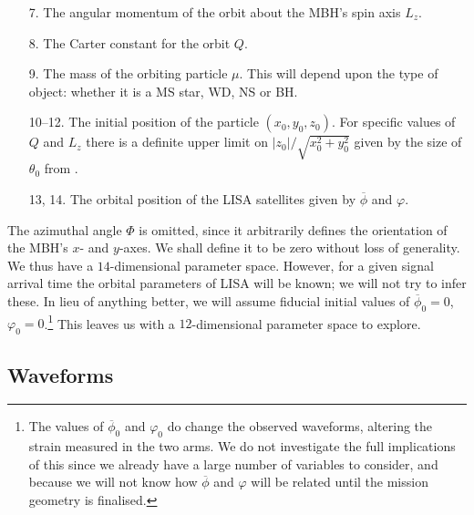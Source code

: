 \begin{enumerate}[leftmargin=*, widest=\:88--88.]
\item[7.] The angular momentum of the orbit about the MBH's spin axis $L_z$.
\item[8.] The Carter constant for the orbit $Q$.
\item[9.] The mass of the orbiting particle $\mu$. This will depend upon the type of object: whether it is a MS star, WD, NS or BH.
\item[10--12.] The initial position of the particle $(x_0, y_0, z_0)$. For specific values of $Q$ and $L_z$ there is a definite upper limit on $|z_0|/\sqrt{x_0^2+y_0^2}$ given by the size of $\theta_0$ from .
\item[13, 14.] The orbital position of the LISA satellites given by $\overline{\phi}$ and $\varphi$.\\
\end{enumerate}%
The azimuthal angle $\Phi$ is omitted, since it arbitrarily defines the orientation of the MBH's $x$- and $y$-axes. We shall define it to be zero without loss of generality. We thus have a $14$-dimensional parameter space. However, for a given signal arrival time the orbital parameters of LISA will be known; we will not try to infer these. In lieu of anything better, we will assume fiducial initial values of $\overline{\phi}_0 = 0$, $\varphi_0 = 0$.\footnote{The values of $\overline{\phi}_0$ and $\varphi_0$ do change the observed waveforms, altering the strain measured in the two arms. We do not investigate the full implications of this since we already have a large number of variables to consider, and because we will not know how $\overline{\phi}$ and $\varphi$ will be related until the mission geometry is finalised.} This leaves us with a $12$-dimensional parameter space to explore.

\subsection{Waveforms}

